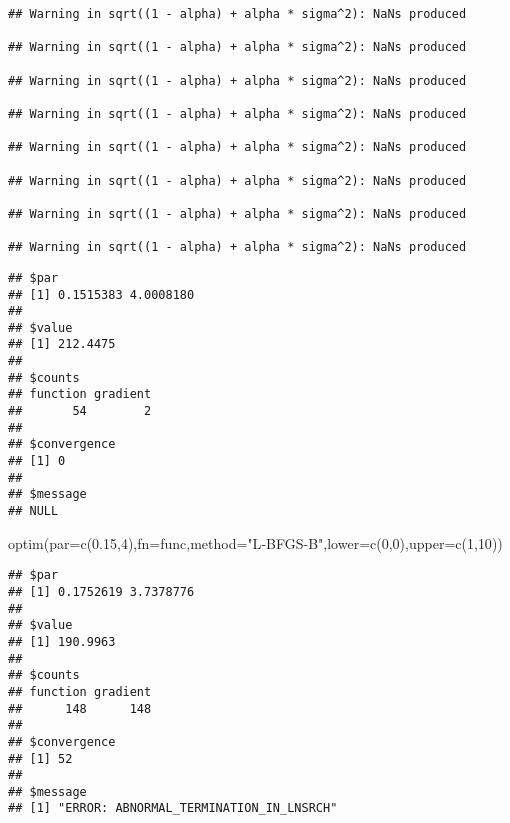 \documentclass[
]{article}
\newenvironment{Shaded}{\begin{snugshade}}{\end{snugshade}}
\newcommand{\AttributeTok}[1]{\textcolor[rgb]{0.77,0.63,0.00}{#1}}
\newcommand{\DecValTok}[1]{\textcolor[rgb]{0.00,0.00,0.81}{#1}}
\newcommand{\FloatTok}[1]{\textcolor[rgb]{0.00,0.00,0.81}{#1}}
\newcommand{\FunctionTok}[1]{\textcolor[rgb]{0.00,0.00,0.00}{#1}}
\newcommand{\NormalTok}[1]{#1}
\newcommand{\StringTok}[1]{\textcolor[rgb]{0.31,0.60,0.02}{#1}}
\begin{document}
\begin{verbatim}
## Warning in sqrt((1 - alpha) + alpha * sigma^2): NaNs produced

## Warning in sqrt((1 - alpha) + alpha * sigma^2): NaNs produced

## Warning in sqrt((1 - alpha) + alpha * sigma^2): NaNs produced

## Warning in sqrt((1 - alpha) + alpha * sigma^2): NaNs produced

## Warning in sqrt((1 - alpha) + alpha * sigma^2): NaNs produced

## Warning in sqrt((1 - alpha) + alpha * sigma^2): NaNs produced

## Warning in sqrt((1 - alpha) + alpha * sigma^2): NaNs produced

## Warning in sqrt((1 - alpha) + alpha * sigma^2): NaNs produced
\end{verbatim}

\begin{verbatim}
## $par
## [1] 0.1515383 4.0008180
## 
## $value
## [1] 212.4475
## 
## $counts
## function gradient 
##       54        2 
## 
## $convergence
## [1] 0
## 
## $message
## NULL
\end{verbatim}

\begin{Shaded}
\begin{Highlighting}[]
\FunctionTok{optim}\NormalTok{(}\AttributeTok{par=}\FunctionTok{c}\NormalTok{(}\FloatTok{0.15}\NormalTok{,}\DecValTok{4}\NormalTok{),}\AttributeTok{fn=}\NormalTok{func,}\AttributeTok{method=}\StringTok{"L{-}BFGS{-}B"}\NormalTok{,}\AttributeTok{lower=}\FunctionTok{c}\NormalTok{(}\DecValTok{0}\NormalTok{,}\DecValTok{0}\NormalTok{),}\AttributeTok{upper=}\FunctionTok{c}\NormalTok{(}\DecValTok{1}\NormalTok{,}\DecValTok{10}\NormalTok{)) }
\end{Highlighting}
\end{Shaded}

\begin{verbatim}
## $par
## [1] 0.1752619 3.7378776
## 
## $value
## [1] 190.9963
## 
## $counts
## function gradient 
##      148      148 
## 
## $convergence
## [1] 52
## 
## $message
## [1] "ERROR: ABNORMAL_TERMINATION_IN_LNSRCH"
\end{verbatim}
\end{document}
